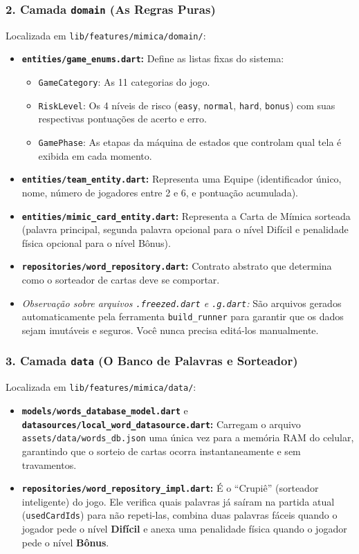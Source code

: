 \documentclass[12pt,a4paper]{article}
\begin{document}
\subsubsection{2. Camada \texttt{domain} (As Regras Puras)}
Localizada em \texttt{lib/features/mimica/domain/}:
\begin{itemize}
  \item \textbf{\texttt{entities/game\_enums.dart}:} Define as listas fixas do sistema:
    \begin{itemize}
      \item \texttt{GameCategory}: As 11 categorias do jogo.
      \item \texttt{RiskLevel}: Os 4 níveis de risco (\texttt{easy}, \texttt{normal}, \texttt{hard}, \texttt{bonus}) com suas respectivas pontuações de acerto e erro.
      \item \texttt{GamePhase}: As etapas da máquina de estados que controlam qual tela é exibida em cada momento.
    \end{itemize}
  \item \textbf{\texttt{entities/team\_entity.dart}:} Representa uma Equipe (identificador único, nome, número de jogadores entre 2 e 6, e pontuação acumulada).
  \item \textbf{\texttt{entities/mimic\_card\_entity.dart}:} Representa a Carta de Mímica sorteada (palavra principal, segunda palavra opcional para o nível Difícil e penalidade física opcional para o nível Bônus).
  \item \textbf{\texttt{repositories/word\_repository.dart}:} Contrato abstrato que determina como o sorteador de cartas deve se comportar.
  \item \textit{Observação sobre arquivos \texttt{.freezed.dart} e \texttt{.g.dart}:} São arquivos gerados automaticamente pela ferramenta \texttt{build\_runner} para garantir que os dados sejam imutáveis e seguros. Você nunca precisa editá-los manualmente.
\end{itemize}

\subsubsection{3. Camada \texttt{data} (O Banco de Palavras e Sorteador)}
Localizada em \texttt{lib/features/mimica/data/}:
\begin{itemize}
  \item \textbf{\texttt{models/words\_database\_model.dart}} e \textbf{\texttt{datasources/local\_word\_datasource.dart}:} Carregam o arquivo \texttt{assets/data/words\_db.json} uma única vez para a memória RAM do celular, garantindo que o sorteio de cartas ocorra instantaneamente e sem travamentos.
  \item \textbf{\texttt{repositories/word\_repository\_impl.dart}:} É o ``Crupiê'' (sorteador inteligente) do jogo. Ele verifica quais palavras já saíram na partida atual (\texttt{usedCardIds}) para não repeti-las, combina duas palavras fáceis quando o jogador pede o nível \textbf{Difícil} e anexa uma penalidade física quando o jogador pede o nível \textbf{Bônus}.
\end{itemize}
\end{document}
